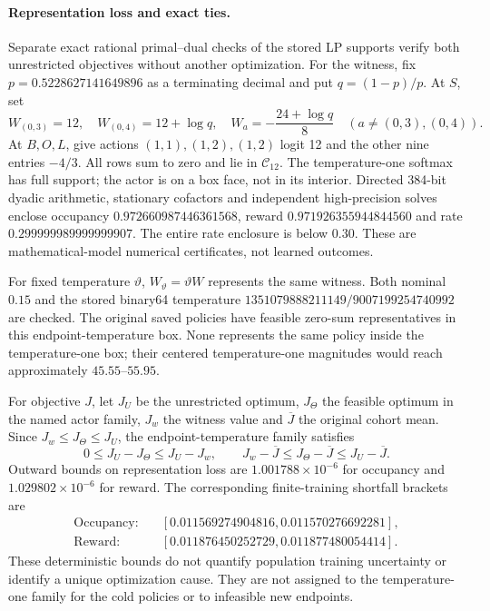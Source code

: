 \documentclass[11pt]{article}
\newcommand{\1}{\mathbf{1}}
\begin{document}
\paragraph{Representation loss and exact ties.}
Separate exact rational primal--dual checks of the stored LP supports verify both unrestricted objectives without another optimization. For the witness, fix $p=0.5228627141649896$ as a terminating decimal and put $q=(1-p)/p$. At $S$, set
\[
 W_{(0,3)}=12,\quad W_{(0,4)}=12+\log q,\quad
 W_a=-\frac{24+\log q}{8}\quad(a\ne(0,3),(0,4)).
\]
At $B,O,L$, give actions $(1,1),(1,2),(1,2)$ logit 12 and the other nine entries $-4/3$. All rows sum to zero and lie in $\mathcal C_{12}$. The temperature-one softmax has full support; the actor is on a box face, not in its interior. Directed 384-bit dyadic arithmetic, stationary cofactors and independent high-precision solves enclose occupancy $0.972660987446361568$, reward $0.971926355944844560$ and rate $0.299999989999999907$. The entire rate enclosure is below $0.30$. These are mathematical-model numerical certificates, not learned outcomes.

For fixed temperature $\vartheta$, $W_{\vartheta}=\vartheta W$ represents the same witness. Both nominal $0.15$ and the stored binary64 temperature $1351079888211149/9007199254740992$ are checked. The original saved policies have feasible zero-sum representatives in this endpoint-temperature box. None represents the same policy inside the temperature-one box; their centered temperature-one magnitudes would reach approximately $45.55$--$55.95$.

For objective $J$, let $J_U$ be the unrestricted optimum, $J_\Theta$ the feasible optimum in the named actor family, $J_w$ the witness value and $\overline J$ the original cohort mean. Since $J_w\le J_\Theta\le J_U$, the endpoint-temperature family satisfies
\[
 0\le J_U-J_\Theta\le J_U-J_w,\qquad
 J_w-\overline J\le J_\Theta-\overline J\le J_U-\overline J.
\]
Outward bounds on representation loss are $1.001788\times10^{-6}$ for occupancy and $1.029802\times10^{-6}$ for reward. The corresponding finite-training shortfall brackets are
\[
 \begin{aligned}
 \text{Occupancy:}&\quad [0.011569274904816,0.011570276692281],\\
 \text{Reward:}&\quad [0.011876450252729,0.011877480054414].
 \end{aligned}
\] These deterministic bounds do not quantify population training uncertainty or identify a unique optimization cause. They are not assigned to the temperature-one family for the cold policies or to infeasible new endpoints.
\end{document}
